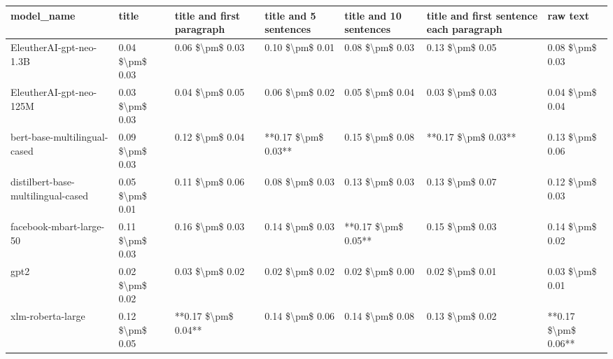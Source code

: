\begin{tabular}{lllllll}
\toprule
                        model\_name &           title & title and first paragraph & title and 5 sentences & title and 10 sentences & title and first sentence each paragraph &            raw text \\
\midrule
           EleutherAI-gpt-neo-1.3B & 0.04 \$\textbackslash pm\$ 0.03 &           0.06 \$\textbackslash pm\$ 0.03 &       0.10 \$\textbackslash pm\$ 0.01 &        0.08 \$\textbackslash pm\$ 0.03 &                         0.13 \$\textbackslash pm\$ 0.05 &     0.08 \$\textbackslash pm\$ 0.03 \\
           EleutherAI-gpt-neo-125M & 0.03 \$\textbackslash pm\$ 0.03 &           0.04 \$\textbackslash pm\$ 0.05 &       0.06 \$\textbackslash pm\$ 0.02 &        0.05 \$\textbackslash pm\$ 0.04 &                         0.03 \$\textbackslash pm\$ 0.03 &     0.04 \$\textbackslash pm\$ 0.04 \\
      bert-base-multilingual-cased & 0.09 \$\textbackslash pm\$ 0.03 &           0.12 \$\textbackslash pm\$ 0.04 &   **0.17 \$\textbackslash pm\$ 0.03** &        0.15 \$\textbackslash pm\$ 0.08 &                     **0.17 \$\textbackslash pm\$ 0.03** &     0.13 \$\textbackslash pm\$ 0.06 \\
distilbert-base-multilingual-cased & 0.05 \$\textbackslash pm\$ 0.01 &           0.11 \$\textbackslash pm\$ 0.06 &       0.08 \$\textbackslash pm\$ 0.03 &        0.13 \$\textbackslash pm\$ 0.03 &                         0.13 \$\textbackslash pm\$ 0.07 &     0.12 \$\textbackslash pm\$ 0.03 \\
           facebook-mbart-large-50 & 0.11 \$\textbackslash pm\$ 0.03 &           0.16 \$\textbackslash pm\$ 0.03 &       0.14 \$\textbackslash pm\$ 0.03 &    **0.17 \$\textbackslash pm\$ 0.05** &                         0.15 \$\textbackslash pm\$ 0.03 &     0.14 \$\textbackslash pm\$ 0.02 \\
                              gpt2 & 0.02 \$\textbackslash pm\$ 0.02 &           0.03 \$\textbackslash pm\$ 0.02 &       0.02 \$\textbackslash pm\$ 0.02 &        0.02 \$\textbackslash pm\$ 0.00 &                         0.02 \$\textbackslash pm\$ 0.01 &     0.03 \$\textbackslash pm\$ 0.01 \\
                 xlm-roberta-large & 0.12 \$\textbackslash pm\$ 0.05 &       **0.17 \$\textbackslash pm\$ 0.04** &       0.14 \$\textbackslash pm\$ 0.06 &        0.14 \$\textbackslash pm\$ 0.08 &                         0.13 \$\textbackslash pm\$ 0.02 & **0.17 \$\textbackslash pm\$ 0.06** \\
\bottomrule
\end{tabular}
